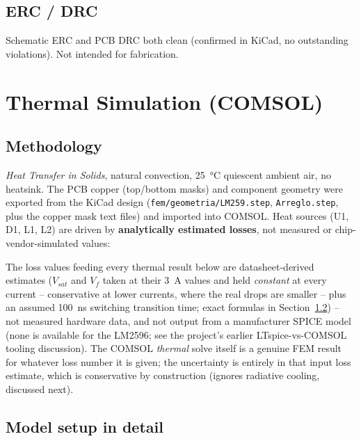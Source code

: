 \documentclass[11pt,letterpaper]{article}
\begin{document}
\subsection{ERC / DRC}

Schematic ERC and PCB DRC both clean (confirmed in KiCad, no outstanding violations). Not intended for
fabrication.

\section{Thermal Simulation (COMSOL)}
\label{sec:thermal}

\subsection{Methodology}

\textit{Heat Transfer in Solids}, natural convection, \SI{25}{\celsius} quiescent ambient air, no
heatsink. The PCB copper (top/bottom masks) and component geometry were exported from the KiCad design
(\texttt{fem/geometria/LM259.step}, \texttt{Arreglo.step}, plus the copper mask text files) and imported
into COMSOL. Heat sources (U1, D1, L1, L2) are driven by \textbf{analytically estimated losses}, not
measured or chip-vendor-simulated values:

\begin{pending}
The loss values feeding every thermal result below are datasheet-derived estimates ($V_{sat}$ and $V_f$
taken at their \SI{3}{\ampere} values and held \emph{constant} at every current -- conservative at lower
currents, where the real drops are smaller -- plus an assumed \SI{100}{\nano\second} switching
transition time; exact formulas in Section~\ref{sec:thermal-model}) -- not measured hardware data, and not output from a manufacturer SPICE model (none is
available for the LM2596; see the project's earlier LTspice-vs-COMSOL tooling discussion). The COMSOL
\emph{thermal} solve itself is a genuine FEM result for whatever loss number it is given; the uncertainty
is entirely in that input loss estimate, which is conservative by construction (ignores radiative cooling,
discussed next).
\end{pending}

\subsection{Model setup in detail}
\label{sec:thermal-model}
\end{document}
